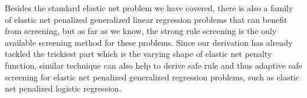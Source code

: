 Besides the standard elastic net problem we have covered, there is also a family of elastic net penalized generalized linear regression problems that can benefit from screening, but as far as we know, the strong rule screening is the only available screening method for these problems. Since our derivation has already tackled the trickiest part which is the varying shape of elastic net penalty function, similar technique can also help to derive safe rule and thus adaptive safe screening for elastic net penalized generalized regression problems, such as elastic net penalized logistic regression.
